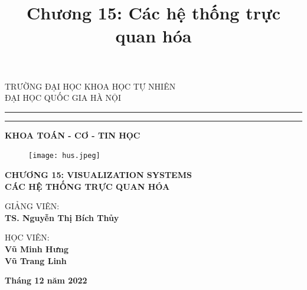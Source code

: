 \documentclass[13pt]{scrartcl} %
\title{Chương 15: Các hệ thống trực quan hóa}
\begin{document}
\begin{titlepage}
    \begin{center}
        {{\Large{\textsc{TRƯỜNG ĐẠI HỌC KHOA HỌC TỰ NHIÊN \\ ĐẠI HỌC QUỐC GIA HÀ NỘI}}}} \rule[0.1cm]{15.8cm}{0.1mm}
        \rule[0.5cm]{15.8cm}{0.6mm}
        {\large{\bf KHOA TOÁN - CƠ - TIN HỌC }}
    \end{center}


    \begin{figure}[!ht] %
        \centering
        \texttt{[image: hus.jpeg]}
    \end{figure}


    \begin{center}
        {\LARGE{\bf CHƯƠNG 15: VISUALIZATION SYSTEMS \\ CÁC HỆ THỐNG TRỰC QUAN HÓA}}
    \end{center}

    \vspace{55mm}

    \hspace{0cm}\begin{minipage}[t]{0.7\textwidth}
        \normalsize{GIẢNG VIÊN:} \\
        \-\hspace{1cm}\large\textbf{TS. Nguyễn Thị Bích Thủy}
    \end{minipage}
    \par

    \vspace{5mm}

    \hspace{0cm}\begin{minipage}[t]{0.7\textwidth}
        \normalsize
        HỌC VIÊN: \\
        \-\hspace{1cm}\large\textbf{Vũ Minh Hưng} \\
        \-\hspace{1cm}\large\textbf{Vũ Trang Linh}
    \end{minipage}
    \par

    \vfill
    \begin{center}
        {\large{\bf Tháng 12 năm 2022 }}
    \end{center}
\end{titlepage}
\end{document}
